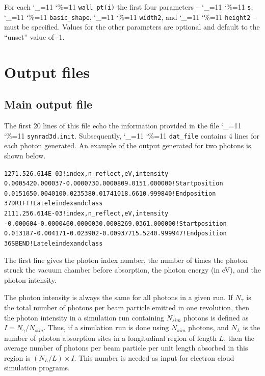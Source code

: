 \documentclass[11pt]{article}
\newcommand\ttcmd{\begingroup\catcode`\_=11 \catcode`\%=11 \dottcmd}
\newcommand\dottcmd[1]{\texttt{#1}\endgroup}
\newcommand{\vn}{\ttcmd}
\newlength{\ExBeg}
\newlength{\ExEnd}
\newenvironment{example}
  {\vspace{\ExBeg} \begin{alltt}}
  {\end{alltt} \vspace{\ExEnd}}
\begin{document}
For each \vn{wall_pt(i)} the first four parameters -- \vn{s},
\vn{basic_shape}, \vn{width2}, and \vn{height2} -- must be
specified. Values for the other parameters are optional and default to
the ``unset'' value of -1.

\section{Output files} 

\subsection{Main output file}
The first 20 lines of this file echo the
information provided in the file \vn{synrad3d.init}.
Subsequently, \vn{dat_file} contains 4 lines for each photon
generated. An example of the output generated for two photons is shown
below.
\begin{example}
 1       2     71.52  6.614E-03  ! index, n_reflect, eV, intensity
    0.000542    0.000037   -0.000073    0.000080       9.015    1.000000  ! Start position
    0.015165    0.004010    0.023538    0.017410      18.661    0.999840  ! End position
      37   DRIFT             ! Lat ele index and class
       2       1     11.25  6.614E-03  ! index, n_reflect, eV, intensity
   -0.000604   -0.000046    0.000003    0.000826       9.036    1.000000  ! Start position
    0.013187   -0.004171   -0.023902   -0.009377      15.524    0.999947  ! End position
      36   SBEND             ! Lat ele index and class
\end{example}
The first line gives the photon index number, the number of times the
photon struck the vacuum chamber before absorption, the photon energy
(in eV), and the photon intensity.

The photon intensity is always the same for all photons in a given
run. If $N_{\gamma}$ is the total number of photons per beam particle
emitted in one revolution, then the photon intensity in a simulation
run containing $N_{sim}$ photons is defined as $I=N_{\gamma}/N_{sim}.$
Thus, if a simulation run is done using $N_{sim}$ photons, and $N_L$
is the number of photon absorption sites in a longitudinal region of
length $L$, then the average number of photons per beam particle per
unit length absorbed in this region is $(N_L/L)\times I.$ This number
is needed as input for electron cloud simulation programs.
\end{document}

